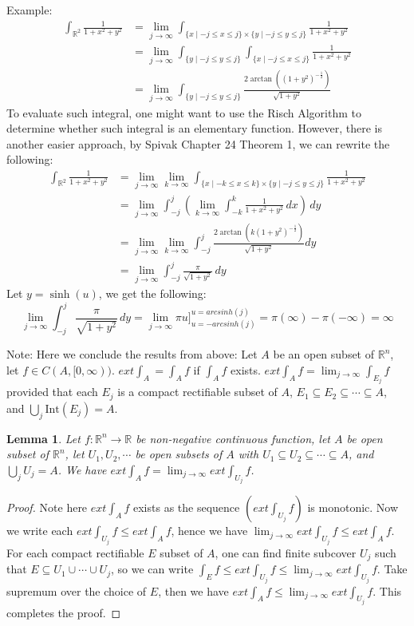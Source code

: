 \documentclass[15pt]{book}
\theoremstyle{break}
\theoremstyle{break}
\newtheorem{lem}{Lemma}[thm]
\newcommand{\R}{\mathbb{R}}
\newcommand{\Int}{\text{Int}}
\newcommand{\note}{\color{red}Note: \color{black}}
\newcommand{\example}{\color{green}Example: \color{black}}
\begin{document}
\hfill\break
\example 
\begin{align*}
\int_{\R^2} \frac{1}{1+x^2+y^2} &= \lim_{j\to \infty} \int_{\{x \mid -j \leq x\leq j\}\times \{y \mid  -j\leq y \leq j\}} \frac{1}{1+x^2+y^2} \\
&= \lim_{j\to \infty} \int_{\{y \mid -j\leq y \leq j\}} \int_{\{x \mid -j \leq x\leq j\}} \frac{1}{1+x^2+y^2} 
\\&= \lim_{j\to \infty} \int_{\{ y \mid -j \leq y \leq j\}} \frac{2\arctan\left((1+y^2)^{-\frac{1}{2}}\right)}{\sqrt{1+y^2}}
\end{align*}
To evaluate such integral, one might want to use the Risch Algorithm to determine whether such integral is an elementary function. However, there is another easier approach, by Spivak Chapter 24 Theorem 1, we can rewrite the following: 
\begin{align*}
\int_{\R^2} \frac{1}{1+x^2+y^2} &= \lim_{j \to \infty} \lim_{k \to \infty} \int_{\{x \mid -k\leq x \leq k \}\times\{y \mid -j \leq y \leq j\}} \frac{1}{1+x^2+y^2} \\&= \lim_{j \to \infty} \int_{-j}^j \left(\lim_{k \to \infty} \int_{-k}^k \frac{1}{1+x^2+y^2} \, dx\right)\, dy 
\\&= \lim_{j \to \infty} \lim_{k \to \infty} \int_{-j}^j \frac{2\arctan \left(k(1+y^2)^{-\frac{1}{2}}\right)}{\sqrt{1+y^2}} dy 
\\&= \lim_{j \to \infty} \int_{-j}^{j} \frac{\pi}{\sqrt{1+y^2}}\, dy
\end{align*}
Let $y = \sinh (u)$, we get the following: 
$$\lim_{j \to \infty} \int_{-j}^{j} \frac{\pi}{\sqrt{1+y^2}}\, dy = \lim_{j\to \infty} \pi u ]_{u=-arcsinh (j)}^{u = arcsinh (j)} = \pi(\infty) - \pi(-\infty) = \infty$$

\note Here we conclude the results from above: Let $A $ be an open subset of $\R^n$, let $f \in C(A, [0,\infty))$. $ext \int_A  = \int_A f$ if $\int_A f$ exists. $ext \int_A f = \lim_{j\to \infty} \int_{E_j} f$ provided that each $E_j$ is a compact rectifiable subset of $A$, $E_1 \subseteq E_2 \subseteq \cdots \subseteq A$, and $\bigcup_{j} \Int(E_j) = A$. 

\begin{lem}
Let $f:\R^n \to \R$ be non-negative continuous function, let $A$ be open subset of $\R^n$, let $U_1,U_2,\cdots$ be open subsets of $A$ with $U_1 \subseteq U_2 \subseteq \cdots \subseteq A$, and $\bigcup_{j}{U_j} = A$. We have $ext\int_A f = \lim_{j\to \infty} ext\int_{U_j} f$.
\end{lem}
\begin{proof}
Note here $ext\int_A f$ exists as the sequence $(ext\int_{U_j} f)$ is monotonic. Now we write each $ext\int_{U_j} f \leq ext \int_A f$, hence we have $\lim_{j\to \infty} ext\int_{U_j} f \leq ext \int_A f$. For each compact rectifiable $E$ subset of $A$, one can find finite subcover $U_j$ such that $E \subseteq U_1 \cup \cdots \cup U_j$, so we can write $\int_E f \leq ext\int_{U_j} f \leq \lim_{j\to \infty} ext \int_{U_j} f$. Take supremum over the choice of $E$, then we have $ext \int_A f \leq  \lim_{j\to \infty} ext\int_{U_j} f$. This completes the proof. 
\end{proof}
\end{document}
